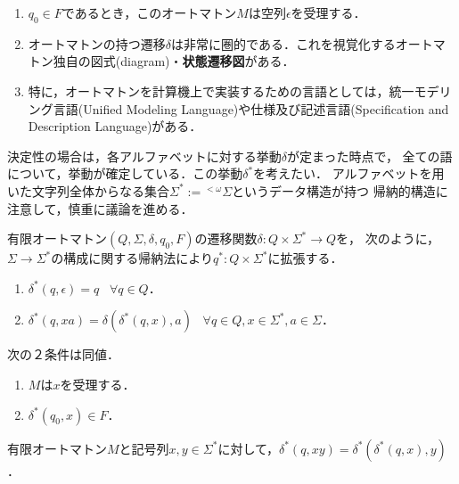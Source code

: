 \documentclass[uplatex, 12pt, dvipdfmx]{jsreport}
\begin{document}
\begin{remark}\mbox{}
    \begin{enumerate}
        \item $q_0\in F$であるとき，このオートマトン$M$は空列$\epsilon$を受理する．
        \item オートマトンの持つ遷移$\delta$は非常に圏的である．これを視覚化するオートマトン独自の図式(diagram)・\textbf{状態遷移図}がある．
        \item 特に，オートマトンを計算機上で実装するための言語としては，統一モデリング言語(Unified Modeling Language)や仕様及び記述言語(Specification and Description Language)がある．
    \end{enumerate}
\end{remark}

決定性の場合は，各アルファベットに対する挙動$\delta$が定まった時点で，
全ての語について，挙動が確定している．この挙動$\delta^*$を考えたい．
アルファベットを用いた文字列全体からなる集合$\Sigma^*:={}^{<\omega}\Sigma$というデータ構造が持つ
帰納的構造に注意して，慎重に議論を進める．

\begin{definition}
    有限オートマトン$(Q,\Sigma,\delta,q_0,F)$の遷移関数$\delta:Q\times\Sigma^*\to Q$を，
    次のように，$\Sigma\to\Sigma^*$の構成に関する帰納法により$q^*:Q\times\Sigma^*$に拡張する．
    \begin{enumerate}
        \item $\delta^*(q,\epsilon)=q\;\;\;\forall q\in Q$．
        \item $\delta^*(q,xa)=\delta(\delta^*(q,x),a)\;\;\;\forall q\in Q,x\in\Sigma^*,a\in\Sigma$．
    \end{enumerate}
\end{definition}

\begin{proposition}[$M$が$x$を受理することの特徴付け]
    次の２条件は同値．
    \begin{enumerate}
        \item $M$は$x$を受理する．
        \item $\delta^*(q_0,x)\in F$．
    \end{enumerate}
\end{proposition}

\begin{proposition}
    有限オートマトン$M$と記号列$x,y\in\Sigma^*$に対して，$\delta^*(q,xy)=\delta^*(\delta^*(q,x),y)$．
\end{proposition}
\end{document}
